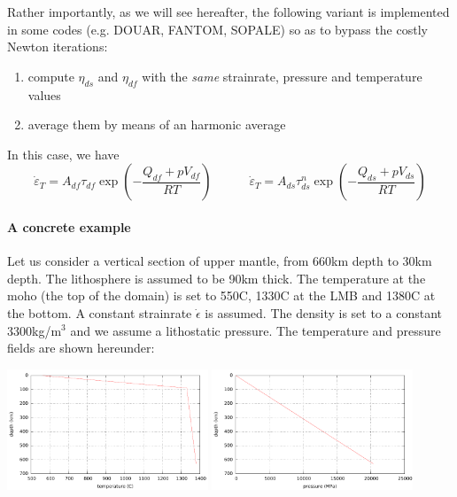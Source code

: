Rather importantly, as we will see hereafter, the following variant is implemented 
in some codes (e.g. DOUAR, FANTOM, SOPALE) so as to bypass the costly Newton iterations:
\begin{enumerate}
\item compute $\eta_{ds}$ and $\eta_{df}$ with the {\it same} strainrate, pressure and temperature values
\item average them by means of an harmonic average
\end{enumerate}
In this case, we have
\[
\dot{\varepsilon}_{T}= 
A_{df} \tau_{df} \exp\left(-\frac{Q_{df}+pV_{df}}{RT}\right)
\quad\quad\quad
\dot{\varepsilon}_{T}= 
A_{ds} \tau_{ds}^n \exp\left(-\frac{Q_{ds}+pV_{ds}}{RT}\right)
\]



\paragraph{A concrete example}
Let us consider a vertical section of upper mantle, from 660km depth to 30km depth.
The lithosphere is assumed to be 90km thick. The temperature at the moho (the top
of the domain) is set to 550C, 1330C at the LMB and 1380C at the bottom.
A constant strainrate $\dot{\epsilon}$ is assumed. The density is set to a constant
3300kg/m$^3$ and we assume a lithostatic pressure.
The temperature and pressure fields are shown hereunder:
\begin{center}
\includegraphics[width=6cm]{images/rheology/effvisc/temperature.pdf}
\includegraphics[width=6cm]{images/rheology/effvisc/pressure.pdf}
\end{center}

